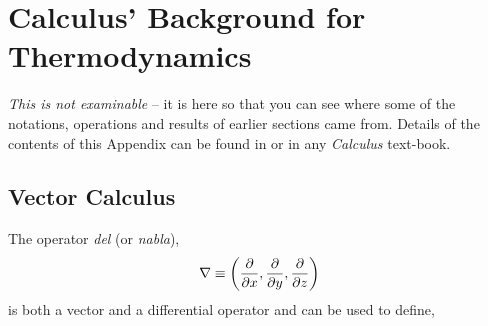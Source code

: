 
\chapter{Calculus' Background for Thermodynamics}\label{Appendix_Calculus}
{\it This is not examinable} -- it is here so that you can see where some of the notations, operations and results of earlier sections came from. Details of the contents of this Appendix can be found in \cite{Leithold_Book,Kallo_1955,Strang_Book} or in any {\it Calculus} text-book.
\bigskip

\section{Vector Calculus}

The operator {\it del} (or {\it nabla}),\index{$\nabla$}
\begin{displaymath}
  \nabla \equiv \left(\displaystyle\frac{\partial}{\partial x}, \frac{\partial}{\partial y}, \frac{\partial}{\partial z}\right)
\end{displaymath} 
is both a vector and a differential operator and can be used to define,
